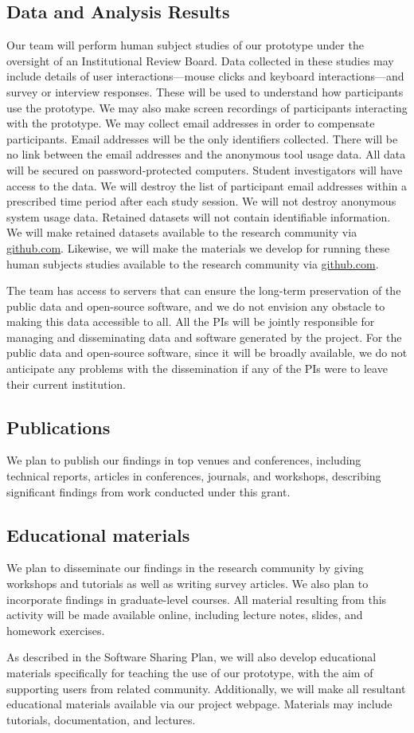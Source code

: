 \subsection*{Data and Analysis Results}
Our team will perform human subject studies of our prototype under the oversight of an Institutional Review Board.  
Data collected in these studies may include details of user interactions---mouse clicks and keyboard interactions---and survey or interview responses. 
These will be used to understand how participants use the prototype. 
We may also make screen recordings of participants interacting with the prototype. 
We may collect email addresses in order to compensate participants.
Email addresses will be the only identifiers collected. 
There will be no link between the email addresses and the anonymous tool usage data. 
All data will be secured on password-protected computers. 
Student investigators will have access to the data. 
We will destroy the list of participant email addresses within a prescribed time period after each study session. 
We will not destroy anonymous system usage data.
Retained datasets will not contain identifiable information.
We will make retained datasets available to the research community via \url{github.com}.
Likewise, we will make the materials we develop for running these human subjects studies available to the research community via \url{github.com}.

The team has access to servers that can ensure the long-term preservation of the public data and open-source software, and we do not envision any obstacle to making this data accessible to all. 
All the PIs will be jointly responsible for managing and disseminating data and software generated by the project. 
For the public data and open-source software, since it will be broadly available, we do not anticipate any problems with the dissemination if any of the PIs were to leave their current institution.

\subsection*{Publications}
We plan to publish our findings in top venues and conferences, including technical reports, articles in conferences, journals, and workshops, describing significant findings from work conducted under this grant.

\subsection*{Educational materials}
We plan to disseminate our findings in the research community by giving workshops and tutorials as well as writing survey articles.  
We also plan to incorporate findings in graduate-level courses. 
All material resulting from this activity will be made available online, including lecture notes, slides, and homework exercises. 

As described in the Software Sharing Plan, we will also develop educational materials specifically for teaching the use of our prototype, with the aim of supporting users from related community.  
Additionally, we will make all resultant educational materials available via our project webpage.  
Materials may include tutorials, documentation, and lectures.